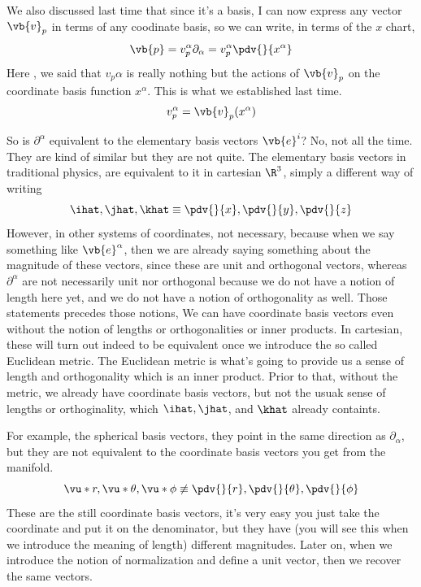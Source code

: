 We also discussed last time that since it's a basis, I can now express any vector $\vb{v}_p$ in terms
of any coodinate basis, so we can write, in terms of the $x$ chart,
\[
	\vb{p} = 
	v_p^\alpha \partial_\alpha = 
	v_p^\alpha \pdv{}{x^\alpha}  
\]
Here , we said that $v_p\alpha$ is really nothing but the actions of $\vb{v}_p$ on the 
coordinate basis function $x^\alpha$. This is what we established last time. 
\[
	v_p^\alpha = \vb{v}_p(x^\alpha)  
\]
\begin{question}{So is $\partial^\alpha$ equivalent to the elementary basis vectors $\vb{e}^i$?}
	No, not all the time. They are kind of similar but they are not quite. The elementary basis vectors
	in traditional physics, are equivalent to it in cartesian $\R^3$, simply
	a different way of writing
	\[
		\ihat, \jhat, \khat \equiv \pdv{}{x},\pdv{}{y},\pdv{}{z} 
	\]
	However, in other systems of coordinates, not necessary, because when we say
	something like $\vb{e}^\alpha$, then we are already saying something about the magnitude
	of these vectors, since these are unit and orthogonal vectors, whereas $\partial^\alpha$ 
	are not necessarily unit nor orthogonal because we do not have a notion of length here yet, 
	and we do not have a notion of orthogonality as well. Those statements precedes those notions,
	We can have coordinate basis vectors even without the notion of lengths or orthogonalities or 
	inner products. In cartesian, these will turn out indeed to be equivalent once we introduce 
	the so called Euclidean metric. The Euclidean metric is what's going to provide us a sense of 
	length and orthogonality which is an inner product. Prior to that, without the metric, we already
	have coordinate basis vectors, but not the usuak sense of lengths or orthoginality, which $\ihat,\jhat$, and $\khat$
	already containts.  

	\hspace{1em}For example, the spherical basis vectors, they point in the same direction as $\partial_\alpha$, but they
	are not equivalent to the coordinate basis vectors you get from the manifold.
	\[
		\vu*{r}, \vu*{\theta}, \vu*{\phi}\not\equiv \pdv{}{r},\pdv{}{\theta}, \pdv{}{\phi}  
	\]
	These are the still coordinate basis vectors, it's very easy you just take the coordinate and put it on the denominator,
	but they have (you will see this when we introduce the meaning of length) different
	magnitudes. Later on, when we introduce the notion of normalization and define a unit vector, then we recover the same vectors. 
\end{question}

